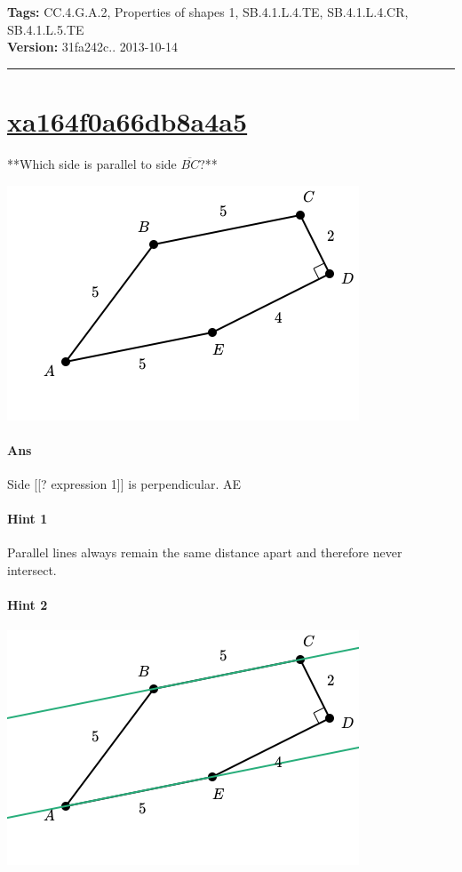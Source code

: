 \documentclass[twocolumn,10pt]{article}
\def\shrinkfactor{0.55}
\begin{document}
\medskip
\noindent
\textbf{Tags:} {\footnotesize CC.4.G.A.2, Properties of shapes 1, SB.4.1.L.4.TE, SB.4.1.L.4.CR, SB.4.1.L.5.TE}\\
\textbf{Version:} 31fa242c.. 2013-10-14
\smallskip\hrule





\section{\href{https://www.khanacademy.org/devadmin/content/items/xa164f0a66db8a4a5}{xa164f0a66db8a4a5}}

\noindent
**Which side is parallel to side $\overline{BC}$?**


\includegraphics[scale=\shrinkfactor]{figures/e89694af7de05350f951069a187e20d95da00947.png}

\paragraph{Ans} Side  [[? expression 1]] is perpendicular.
  AE

\paragraph{Hint 1}Parallel lines always remain the same distance apart and therefore never intersect. 

\paragraph{Hint 2}
\includegraphics[scale=\shrinkfactor]{figures/8037be89852b1d59afbf6ea45e9d72c8640c7e6b.png}
\end{document}
